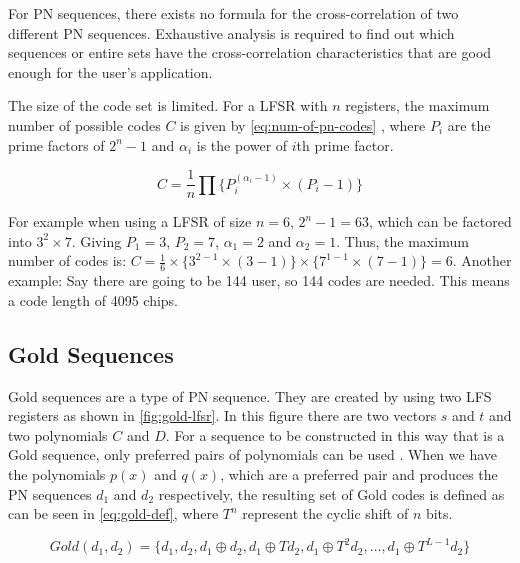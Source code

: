 For PN sequences, there exists no formula for the cross-correlation of two different PN sequences. 
Exhaustive analysis is required to find out which sequences or entire sets have the cross-correlation characteristics that are good enough for the user's application.

The size of the code set is limited.
For a LFSR with $n$ registers, the maximum number of possible codes $C$ is given by \autoref{eq:num-of-pn-codes} \cite{mutagi1996pseudo}, where $P_i$ are the prime factors of $2^n - 1$ and $\alpha_i$ is the power of $i$th prime factor.

\begin{equation}
	\label{eq:num-of-pn-codes}
	C = \frac{1}{n} \prod \{ P_{i} ^ {(\alpha_i - 1)} \times (P_i - 1) \}
\end{equation}

For example when using a LFSR of size $n = 6$, $2^n - 1 = 63$, which can be factored into $3^2 \times 7$.
Giving $P_1 = 3$, $P_2 = 7$, $\alpha_1 = 2$ and $\alpha_2 = 1$.
Thus, the maximum number of codes is: $C = \frac{1}{6} \times \{ 3^{2 - 1} \times (3 - 1) \} \times \{ 7^{1 - 1} \times (7 - 1) \} = 6$.
Another example: Say there are going to be 144 user, so 144 codes are needed. 
This means a code length of 4095 chips.
















\subsection{Gold Sequences}

Gold sequences are a type of PN sequence. 
They are created by using two LFS registers as shown in \autoref{fig:gold-lfsr}.
In this figure there are two vectors $s$ and $t$ and two polynomials $C$ and $D$.
For a sequence to be constructed in this way that is a Gold sequence, only preferred pairs of polynomials can be used \cite{kedia2012comparative}.
When we have the polynomials $p(x)$ and $q(x)$, which are a preferred pair and produces the PN sequences $d_1$ and $d_2$ respectively, the resulting set of Gold codes is defined as can be seen in \autoref{eq:gold-def}, where $T^n$ represent the cyclic shift of $n$ bits.

\begin{equation}
	\label{eq:gold-def}
	Gold(d_1, d_2) = \{ d_1, d_2, d_1 \oplus d_2, d_1 \oplus Td_2, d_1 \oplus T^2d_2, \dotsc, d_1 \oplus T^{L - 1}d_2 \}
\end{equation}


